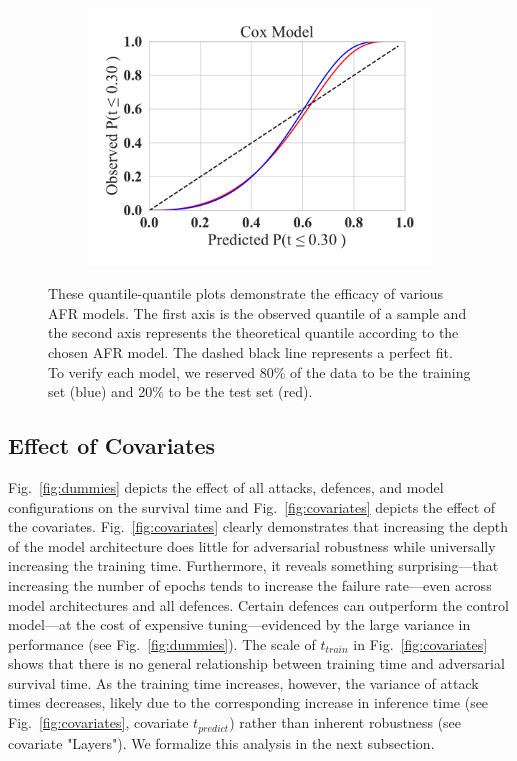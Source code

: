 \begin{figure}
\begin{subfigure}
	\end{subfigure}
	~
	\begin{subfigure}
		\centering
		\includegraphics[width=.32\textwidth]{plots/cox_qq.pdf}
	\end{subfigure}
	\caption{These quantile-quantile plots demonstrate the efficacy of various AFR models. The first axis is the observed quantile of a sample and the second axis represents the theoretical quantile according to the chosen AFR model. The dashed black line represents a perfect fit. To verify each model, we reserved 80\% of the data to be the training set (blue) and 20\% to be the test set (red). 
 }
	\label{fig:afr_models}
\end{figure}

\subsection{Effect of Covariates}
Fig.~\ref{fig:dummies} depicts the effect of all attacks, defences, and model configurations on the survival time and Fig.~\ref{fig:covariates} depicts the effect of the covariates. 
Fig.~\ref{fig:covariates} clearly demonstrates that increasing the depth of the model architecture does little for adversarial robustness while universally increasing the training time. 
Furthermore, it reveals something surprising---that increasing the number of epochs tends to increase the failure rate---even across model architectures and all defences. 
Certain defences can outperform the control model---at the cost of expensive tuning---evidenced by the large variance in performance (see Fig.~\ref{fig:dummies}). The scale of $t_{train}$  in Fig.~\ref{fig:covariates} shows that there is no general relationship between training time and adversarial survival time. 
As the training time increases, however, the variance of attack times decreases, likely due to the corresponding increase in inference time (see Fig.~\ref{fig:covariates}, covariate $t_{predict}$) rather than inherent robustness (see covariate "Layers").
We formalize this analysis  in the next subsection.

